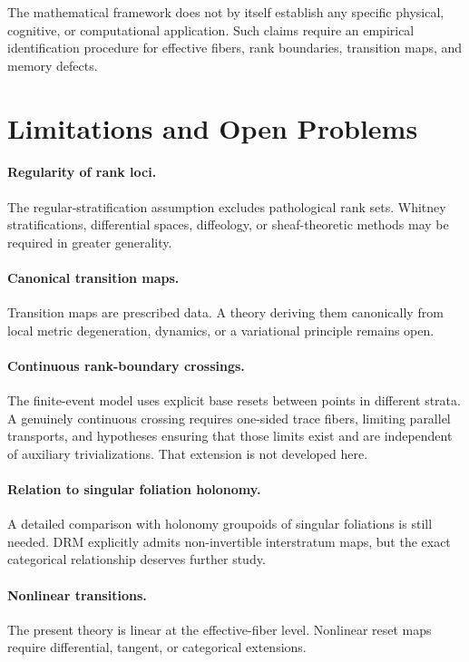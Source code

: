 \documentclass[11pt]{article}
\begin{document}
The mathematical framework does not by itself establish any specific physical,
cognitive, or computational application. Such claims require an empirical
identification procedure for effective fibers, rank boundaries, transition
maps, and memory defects.

\section{Limitations and Open Problems}
\label{sec:limitations}

\paragraph{Regularity of rank loci.}
The regular-stratification assumption excludes pathological rank sets.
Whitney stratifications, differential spaces, diffeology, or sheaf-theoretic
methods may be required in greater generality.

\paragraph{Canonical transition maps.}
Transition maps are prescribed data. A theory deriving them canonically from
local metric degeneration, dynamics, or a variational principle remains open.

\paragraph{Continuous rank-boundary crossings.}
The finite-event model uses explicit base resets between points in different
strata. A genuinely continuous crossing requires one-sided trace fibers,
limiting parallel transports, and hypotheses ensuring that those limits exist
and are independent of auxiliary trivializations. That extension is not
developed here.

\paragraph{Relation to singular foliation holonomy.}
A detailed comparison with holonomy groupoids of singular foliations is still
needed. DRM explicitly admits non-invertible interstratum maps, but the exact
categorical relationship deserves further study.

\paragraph{Nonlinear transitions.}
The present theory is linear at the effective-fiber level. Nonlinear reset
maps require differential, tangent, or categorical extensions.
\end{document}
